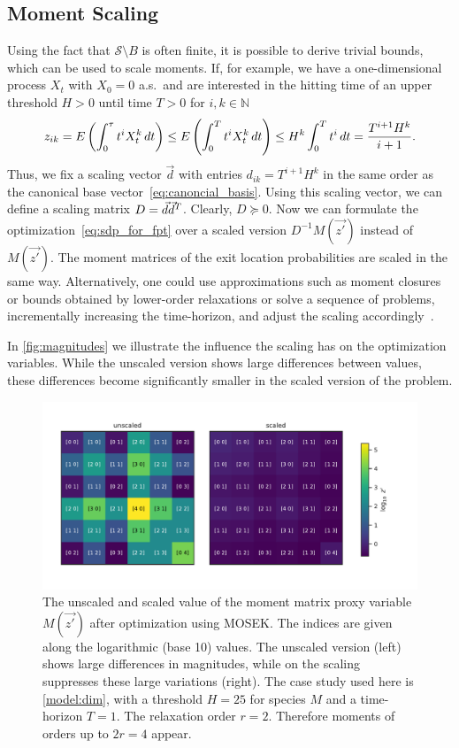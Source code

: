 \subsection{Moment Scaling}\label{sec:mfpt:scaling}
Using the fact that
$\mathcal{S}\setminus {B}$ is often finite,
it is possible to derive trivial bounds, which can be used to scale moments.
If, for example, we have a one-dimensional process $X_t$ with $X_0 = 0$ a.s.\ and are interested in the hitting
time of an upper threshold $H>0$ until time $T>0$ for $i,k\in \mathbb N$
$$
z_{ik} = {E}\left(\int_0^{\tau}t^i X_t^k\,dt\right)\leq{E}\left(\int_0^T t^i X_t^k\,dt\right)\leq H^k\int_0^T t^i\,dt
=\frac{T^{i+1}H^k}{i+1}.$$
Thus, we fix a scaling vector $\vec d$ with entries $d_{ik}={T^{i+1}H^k}$ in
the same order
as the canonical base vector~\eqref{eq:canoncial_basis}.
Using this scaling vector, we can define a scaling
matrix $D={\vec d}{\vec{d}}^{T}$.
Clearly, $D \succeq 0$.
Now we can formulate the optimization~\eqref{eq:sdp_for_fpt}
over a scaled version $D^{-1}M(\vec{z'})$ instead of $M(\vec{z'})$.
The moment matrices of the exit location probabilities are scaled in the same
way.
Alternatively, one could use approximations such as moment closures
or bounds obtained by lower-order relaxations or solve a sequence
of problems, incrementally increasing
the time-horizon, and adjust the scaling accordingly~\cite{dowdy2018dynamic}.

In \autoref{fig:magnitudes} we illustrate the influence the scaling has on the
optimization variables. While the unscaled version shows large differences
between values, these differences become significantly smaller in the scaled version
of the problem.
\begin{figure}[htb]
    \centering
    \includegraphics[scale=0.65]{gfx/magnitudes.pdf}
	\caption[Unscaled and scaled value of the moment matrix]{The unscaled and scaled value of the moment matrix proxy variable
    $M(\vec{z'})$ after optimization using MOSEK. The indices are given along the
    logarithmic (base 10) values. The unscaled version (left) shows large
    differences in magnitudes, while on the scaling suppresses
    these large variations (right). The case study used here is \autoref{model:dim},
    with a threshold $H=25$ for species $M$ and a time-horizon $T=1$. The
    relaxation order $r=2$. Therefore moments of orders up to $2r=4$ appear.}
    \label{fig:magnitudes}
\end{figure}


